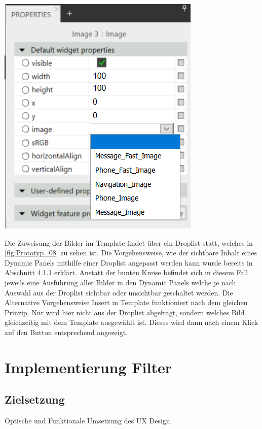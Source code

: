 \begin{center}
  \includegraphics[scale=0.6]{figures/Prototyp_08.PNG}
  \label{fig:Prototyp_08}
\end{center}

Die Zuweisung der Bilder im Template findet über ein Droplist statt, welches in \cref{fig:Prototyp_08} zu sehen ist.
Die Vorgehensweise, wie der sichtbare Inhalt eines Dynamic Panels mithilfe einer Droplist angepasst werden kann wurde bereits in Abschnitt 4.1.1 erklärt.
Anstatt der bunten Kreise befindet sich in diesem Fall jeweils eine Ausführung aller Bilder in den Dynamic Panels welche je nach Auswahl aus der Droplist sichtbar oder unsichtbar geschaltet werden.
Die Alternative Vorgehensweise \glqq Insert in Template\grqq{} funktioniert nach dem gleichen Prinzip.
Nur wird hier nicht aus der Droplist abgefragt, sondern welches Bild gleichzeitig mit dem Template ausgewählt ist.
Dieses wird dann nach einem Klick auf den Button entsprechend angezeigt.


\section {Implementierung Filter}
\subsection {Zielsetzung}
Optische und Funktionale Umsetzung des UX Design

